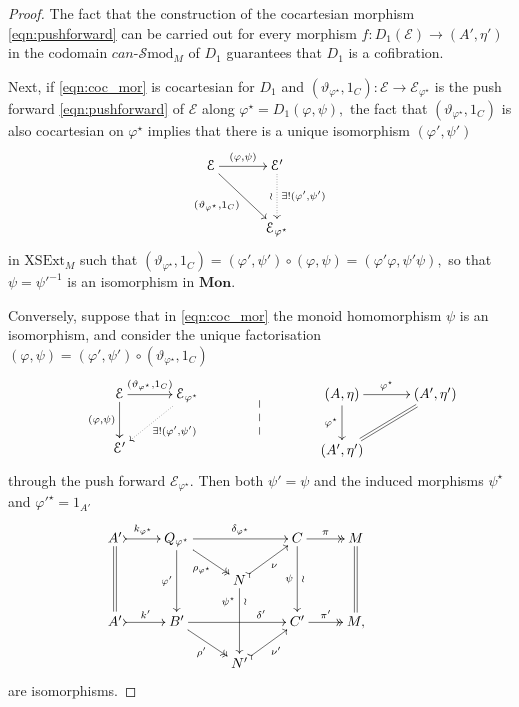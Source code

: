 \documentclass[a4paper]{amsart}
\theoremstyle{plain}
\theoremstyle{definition}
\theoremstyle{remark}
\begin{document}
\begin{proof}
The fact that the construction of the cocartesian morphism \eqref{eqn:pushforward} can be carried out for every morphism $f\colon D_1(\mathcal{E})\longrightarrow(A',\eta')$ in the codomain $can\text{-}\mathcal{S}\mathrm{mod}_M$ of $D_1$ guarantees that $D_1$ is a cofibration.

Next, if \eqref{eqn:coc_mor} is cocartesian for $D_1$ and $(\vartheta_{\varphi^\star},1_C)\colon\mathcal{E}\longrightarrow\mathcal{E}_{\varphi^\star}$ is the push forward \eqref{eqn:pushforward} of $\mathcal{E}$ along $\varphi^\star=D_1(\varphi,\psi),$ the fact that $(\vartheta_{\varphi^\star},1_C)$ is also cocartesian on $\varphi^\star$ implies that there is a unique isomorphism $(\varphi',\psi')$
\begin{equation*}
\xymatrixrowsep{2.5pc}
\xymatrixcolsep{2.5pc}
\xymatrix{
{\mathcal{E}} \ar[r]^-{(\varphi,\psi)} \ar[rd]_-{(\vartheta_{\varphi^\star},1_C)} &{\mathcal{E}'} \ar@{.>}[d]^-{\exists!(\varphi',\psi')}_-{\wr} \\
&{\mathcal{E}_{\varphi^\star}}
}
\end{equation*}
in $\mathrm{XSExt}_M$ such that $(\vartheta_{\varphi^\star},1_C)=(\varphi',\psi')\circ(\varphi,\psi)=(\varphi'\varphi,\psi'\psi),$ so that $\psi={\psi'}^{-1}$ is an isomorphism in $\mathbf{Mon}.$

Conversely, suppose that in \eqref{eqn:coc_mor} the monoid homomorphism $\psi$ is an isomorphism, and consider the unique factorisation $(\varphi,\psi)=(\varphi',\psi')\circ(\vartheta_{\varphi^\star},1_C)$
\begin{equation*}
\centering
\xymatrixcolsep{2.5pc}
\xymatrix{
&{\mathcal{E}} \ar[r]^-{(\vartheta_{\varphi^\star},1_C)} \ar[d]_-{(\varphi,\psi)} &{\mathcal{E}_{\varphi^\star}} \ar@{.>}[dl]^{\exists! (\varphi',\psi')}\\
&{\mathcal{E}'}  &\
}
\xymatrix{
&\ \ar@{--}[d] \\
&\
}
\xymatrix{
&{(A,\eta)}  \ar[d]_-{\varphi^\star}  \ar[r]^-{\varphi^\star} &{(A',\eta')}  \ar@{=}[dl] \\
&{(A',\eta')} &\
}
\end{equation*}
through the push forward $\mathcal{E}_{\varphi^\star}.$ Then both $\psi'=\psi$ and the induced morphisms $\psi^\star$ and ${\varphi'}^\star=1_{A'}$
\begin{equation*}
\xymatrixrowsep{1.3pc}
\xymatrix{
{A'} \ar@{=}[dd] \ar@{>->}[r]^-{k_{\varphi^\star}} &{Q_{\varphi^\star}} \ar[dd]_-{\varphi'} \ar@{->>}[rd]_-{\rho_{\varphi^\star}} \ar[rr]^-{\delta_{\varphi^\star}} & \ &C  \ar[dd]_-{\psi}^-{\wr} \ar@{->>}[r]^-{\pi} &{M}  \ar@{=}[dd] \\
 &\ &N \ar[dd]_(.25){\psi^\star}^(.25){\wr} \ar@{>->}[ru]_-{\nu}&\ &\ &\ \\
{A'} \ar@{>->}[r]^-{k'} &{B'} \ar@{->>}[rd]_-{\rho'} \ar[rr]^(.70){\delta'} & \ &{C'} \ar@{->>}[r]^-{\pi'} &{M,} \\
 &\ &{N'} \ar@{>->}[ru]_-{\nu'}&\ &\ &\
}
\end{equation*}
are isomorphisms.


\end{proof}
\end{document}
